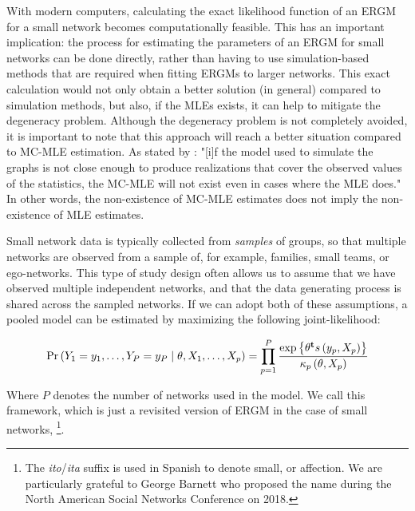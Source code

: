 \documentclass[12pt]{article}
\begin{document}
With modern computers, calculating the exact likelihood function of an ERGM for a small network becomes computationally feasible. This has an important implication: the process for estimating the parameters of an ERGM for small networks can be done directly, rather than having to use simulation-based methods that are required when fitting ERGMs to larger networks. This exact calculation would not only obtain a better solution (in general) compared to simulation methods, but also, if the MLEs exists, it can help to mitigate the degeneracy problem. Although the degeneracy problem is not completely avoided, it is important to note that this approach will reach a better situation compared to MC-MLE estimation. As stated by \cite[p. 7]{Handcock2003}: "[i]f the model used to simulate the graphs is not close enough to produce realizations that cover the observed values of the statistics, the MC-MLE will not exist even in cases where the MLE does." In other words, the non-existence of MC-MLE estimates does not imply the non-existence of MLE estimates.

Small network data is typically collected from \textit{samples} of groups, so that multiple networks are observed from a sample of, for example, families, small teams, or ego-networks. This type of study design often allows us to assume that we have observed multiple independent networks, and that the data generating process is shared across the sampled networks. If we can adopt both of these assumptions, a pooled model can be estimated by maximizing the following joint-likelihood:

\begin{equation}
    \label{eq:ergm-pooled}
    \Prcond{\Adjmat_1 = \adjmat_1, \dots, \Adjmat_P = \adjmat_P}{\params, \Indepvar_1, \dots, \Indepvar_p} = \prod_{p=1}^P\frac{%
    		\exp{\transpose{\params}\sufstats{\adjmat_p, \Indepvar_p}}%
    	}{
    		\kappa_p\left(\params, \Indepvar_p\right)
    	}
\end{equation}

\noindent Where $P$ denotes the number of networks used in the model. We call this framework, which is just a revisited version of ERGM in the case of small networks, \ergmito{}\footnote{The \textit{ito}/\textit{ita} suffix is used in Spanish to denote small, or affection. We are particularly grateful to George Barnett who proposed the name during the North American Social Networks Conference on 2018.}.
\end{document}
